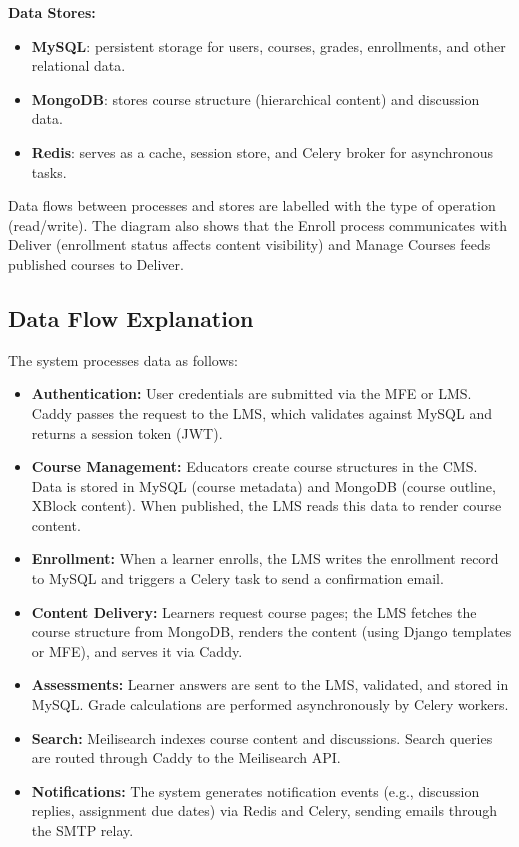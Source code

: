 \textbf{Data Stores:}
\begin{itemize}
    \item \textbf{MySQL}: persistent storage for users, courses, grades, enrollments, and other relational data.
    \item \textbf{MongoDB}: stores course structure (hierarchical content) and discussion data.
    \item \textbf{Redis}: serves as a cache, session store, and Celery broker for asynchronous tasks.
\end{itemize}

Data flows between processes and stores are labelled with the type of operation (read/write). The diagram also shows that the Enroll process communicates with Deliver (enrollment status affects content visibility) and Manage Courses feeds published courses to Deliver.

\subsection{Data Flow Explanation}
The system processes data as follows:

\begin{itemize}
    \item \textbf{Authentication:} User credentials are submitted via the MFE or LMS. Caddy passes the request to the LMS, which validates against MySQL and returns a session token (JWT).
    \item \textbf{Course Management:} Educators create course structures in the CMS. Data is stored in MySQL (course metadata) and MongoDB (course outline, XBlock content). When published, the LMS reads this data to render course content.
    \item \textbf{Enrollment:} When a learner enrolls, the LMS writes the enrollment record to MySQL and triggers a Celery task to send a confirmation email.
    \item \textbf{Content Delivery:} Learners request course pages; the LMS fetches the course structure from MongoDB, renders the content (using Django templates or MFE), and serves it via Caddy.
    \item \textbf{Assessments:} Learner answers are sent to the LMS, validated, and stored in MySQL. Grade calculations are performed asynchronously by Celery workers.
    \item \textbf{Search:} Meilisearch indexes course content and discussions. Search queries are routed through Caddy to the Meilisearch API.
    \item \textbf{Notifications:} The system generates notification events (e.g., discussion replies, assignment due dates) via Redis and Celery, sending emails through the SMTP relay.
\end{itemize}


